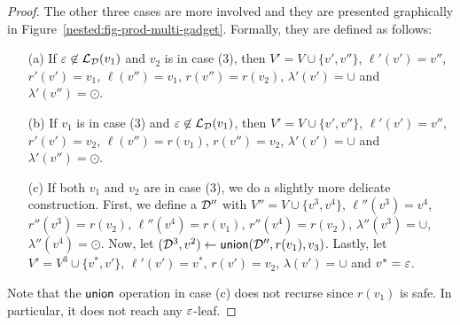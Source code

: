 \begin{proof}


The other three cases are more involved and they are presented graphically in Figure~\ref{nested:fig-prod-multi-gadget}. 
Formally, they are defined as follows:
\begin{itemize}
	\item[(a)] If $\varepsilon\not\in\mathcal{L}_{\mathcal{D}}(v_1)$ and $v_2$ is in case (3), then $V' = V\cup\{v',v''\}$, $\ell'(v') = v''$, $r'(v') = v_1$, $\ell(v'') = v_1$,  $r(v'') = r(v_2)$, $\lambda'(v') = \cup$ and $\lambda'(v'') = \odot$. 
	\item[(b)] If $v_1$ is in case (3) and $\varepsilon\not\in\mathcal{L}_{\mathcal{D}}(v_1)$, then $V' = V\cup\{v',v''\}$,  $\ell'(v') = v''$, $r'(v') = v_2$, $\ell(v'') = r(v_1)$,  $r(v'') = v_2$, $\lambda'(v') = \cup$ and $\lambda'(v'') = \odot$. 
	\item[(c)] If both $v_1$ and $v_2$ are in case (3), we do a slightly more delicate construction. 
	First, we define a $\mathcal{D}''$ with $V'' = V\cup\{v^{3},v^{4}\}$, $\ell''(v^3) = v^4$, $r''(v^3) = r(v_2)$, $\ell''(v^4) = r(v_1)$, $r''(v^4) = r(v_2)$, $\lambda''(v^3) = \cup$, $\lambda''(v^4) = \odot$.
	Now, let $(\mathcal{D}^3, v^2) \gets \mathsf{union}(\mathcal{D}'', r(v_1), v_3)$.
	Lastly, let $V' = V^3 \cup \{v^{*}, v'\}$, $\ell'(v') = v^*$, $r(v') = v_2$, $\lambda(v') = \cup$ and $v^* = \varepsilon$.
\end{itemize}
Note that the $\mathsf{union}$ operation in case (c) does not recurse since $r(v_1)$ is safe. In particular, it does not reach any $\varepsilon$-leaf.


\end{proof}

